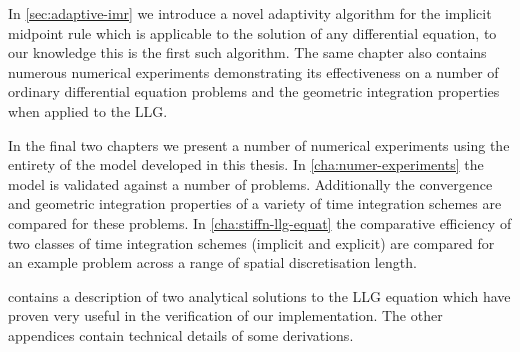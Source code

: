 In \cref{sec:adaptive-imr} we introduce a novel adaptivity algorithm for the implicit midpoint rule which is applicable to the solution of any differential equation, to our knowledge this is the first such algorithm.
The same chapter also contains numerous numerical experiments demonstrating its effectiveness on a number of ordinary differential equation problems and the geometric integration properties when applied to the LLG.

In the final two chapters we present a number of numerical experiments using the entirety of the model developed in this thesis.
In \cref{cha:numer-experiments} the model is validated against a number of problems.
Additionally the convergence and geometric integration properties of a variety of time integration schemes are compared for these problems.
In \cref{cha:stiffn-llg-equat} the comparative efficiency of two classes of time integration schemes (implicit and explicit) are compared for an example problem across a range of spatial discretisation length.

 contains a description of two analytical solutions to the LLG equation which have proven very useful in the verification of our implementation.
The other appendices contain technical details of some derivations.


